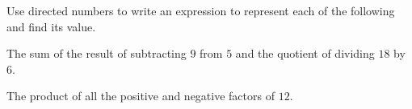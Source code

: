  Use directed numbers to write an expression to represent each of the following and find its value.

\begin{subparts}
  \item The sum of the result of subtracting $9$ from $5$ and the quotient of dividing $18$ by $6$.
  \item The product of all the positive and negative factors of $12$.
\end{subparts}

